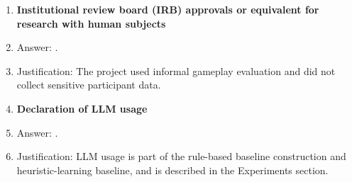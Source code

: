 \documentclass{article}
\begin{document}
\begin{enumerate}
\item {\bf Institutional review board (IRB) approvals or equivalent for research with human subjects}
    \item[] Answer: \answerNA{}.
    \item[] Justification: The project used informal gameplay evaluation and did not collect sensitive participant data.

\item {\bf Declaration of LLM usage}
    \item[] Answer: \answerYes{}.
    \item[] Justification: LLM usage is part of the rule-based baseline construction and heuristic-learning baseline, and is described in the Experiments section.
\end{enumerate}
\end{document}

